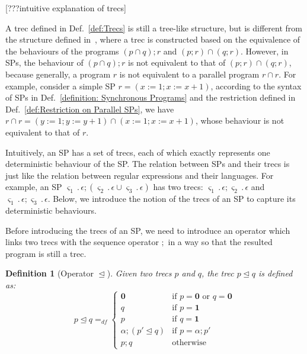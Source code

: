 \documentclass{fcs}
\newtheorem{mydef}{Definition}[section]
\newcommand{\sig}[0]{\varsigma}
\newcommand{\noth}[0]{\mathbf{1}}
\newcommand{\halt}[0]{\mathbf{0}}
\DeclareMathOperator{\seq}{;}
\DeclareMathOperator{\para}{\cap}
\DeclareMathOperator{\nex}{.}
\DeclareMathOperator{\link}{\unlhd}
\newcommand{\dddef}[0]{=_{df}}
\begin{document}
[???intuitive explanation of trecs]

A trec defined in Def.~\ref{def:Trecs} is still a tree-like structure, but is different from the structure defined in~\cite{???}, where a trec is constructed based on the equivalence of the behaviours of the programs $(p\para q)\seq r$ and $(p\seq r)\para(q\seq r)$. However, in SPs, the behaviour of $(p\para q)\seq r$ is not equivalent to that of $(p\seq r)\para(q\seq r)$, because generally, a program $r$ is not equivalent to
a parallel program $r\para r$.
\fi
For example, consider a simple SP $r = (x:=1 \seq x:= x+1)$, according to the syntax of SPs in Def.~\ref{definition: Synchronous Programs} and the restriction defined in Def.~\ref{def:Restriction on Parallel SPs}, we have $r\para r = (y:=1\seq y:=y+1)\para(x:=1\seq x:=x+1)$, whose behaviour is not equivalent to that of $r$.

Intuitively, an SP has a set of trecs, each of which exactly represents one deterministic behaviour of the SP.
The relation between SPs and their trecs is just like the relation between regular expressions and their languages.
For example, an SP $\sig_1\nex \epsilon\seq (\sig_2\nex \epsilon\cup \sig_3\nex \epsilon)$ has two trecs: $\sig_1\nex \epsilon\seq \sig_2\nex \epsilon$ and $\sig_1\nex \epsilon \seq \sig_3\nex \epsilon$.
Below, we introduce the notion of the trecs of an SP to capture its deterministic behaviours.

Before introducing the trecs of an SP, we need to introduce an operator which links two trecs with the sequence operator $\seq$ in a way so that the resulted program is still a trec.


\begin{mydef}[Operator $\link$]
    \label{def:Operator link}
    Given two trecs $p$ and $q$, the trec $p\link q$ is defined as:
    $$
    p\link q\dddef \left\{\begin{array}{ll}
    \halt & \mbox{if $p=\halt$ or $q=\halt$}\\
    q & \mbox{if $p = \noth$}\\
    p & \mbox{if $q=\noth$}\\
    \alpha\seq (p'\link q) & \mbox{if $p = \alpha\seq p'$}\\
    p\seq q & \mbox{otherwise}
    \end{array}
    \right.
    $$
\end{mydef}
\end{document}
